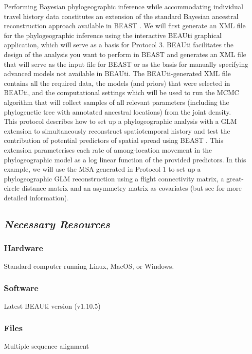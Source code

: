 \documentclass{article}
\begin{document}
Performing Bayesian phylogeographic inference while accommodating individual travel history data constitutes an extension of the standard Bayesian ancestral reconstruction approach available in BEAST \cite{dta}.
We will first generate an XML file for the phylogeographic inference using the interactive BEAUti graphical application, which will serve as a basis for Protocol 3. BEAUti facilitates the design of the analysis you want to perform in BEAST and generates an XML file that will serve as the input file for BEAST or as the basis for manually specifying advanced models not available in BEAUti.
The BEAUti-generated XML file contains all the required data, the models (and priors) that were selected in BEAUti, and the computational settings which will be used to run the MCMC algorithm that will collect samples of all relevant parameters (including the phylogenetic tree with annotated ancestral locations) from the joint density. \\

This protocol describes how to set up a phylogeographic analysis with a GLM extension to simultaneously reconstruct spatiotemporal history and test the contribution of potential predictors of spatial spread using BEAST \cite{glm}.
This  extension parameterises each rate of among-location movement in the phylogeographic model as a log linear function of the provided predictors.
In this example, we will use the MSA generated in Protocol 1 to set up a phylogeographic GLM reconstruction using a flight connectivity matrix, a great-circle distance matrix and an asymmetry matrix as covariates (but see \cite{travhist} for more detailed information).


\subsection*{\textbf{\textit{Necessary Resources}}}
\subsubsection*{Hardware}
\hspace{0.5cm}Standard computer running Linux, MacOS, or Windows.

\subsubsection*{Software}
\hspace{0.5cm}Latest BEAUti version (v1.10.5)

\subsubsection*{Files}
\hspace{0.5cm}Multiple sequence alignment
\end{document}
